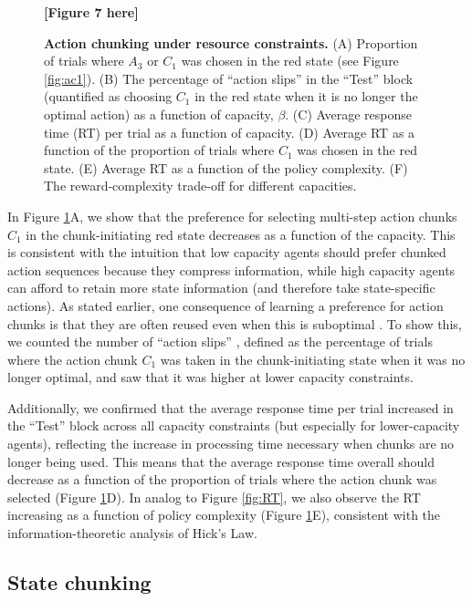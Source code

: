 \documentclass[11pt]{article}
\begin{document}
\begin{figure}
    \centering
    \textbf{[Figure 7 here]}
    \caption{\textbf{Action chunking under resource constraints.} (A) Proportion of trials where $A_3$ or $C_1$ was chosen in the red state (see Figure \ref{fig:ac1}). (B) The percentage of ``action slips'' in the ``Test'' block (quantified as choosing $C_1$ in the red state when it is no longer the optimal action) as a function of capacity, $\beta$. (C) Average response time (RT) per trial as a function of capacity. (D) Average RT as a function of the proportion of trials where $C_1$ was chosen in the red state. (E) Average RT as a function of the policy complexity. (F) The reward-complexity trade-off for different capacities.}
    \label{fig:ac2}
\end{figure}

In Figure \ref{fig:ac2}A, we show that the preference for selecting multi-step action chunks $C_1$ in the chunk-initiating red state decreases as a function of the capacity. This is consistent with the intuition that low capacity agents should prefer chunked action sequences because they compress information, while high capacity agents can afford to retain more state information (and therefore take state-specific actions). As stated earlier, one consequence of learning a preference for action chunks is that they are often reused even when this is suboptimal \citep{Huys2015-cq}. To show this, we counted the number of  ``action slips'' \citep[cf.][]{norman81}, defined as the percentage of trials where the action chunk $C_1$ was taken in the chunk-initiating state when it was no longer optimal, and saw that it was higher at lower capacity constraints. 

Additionally, we confirmed that the average response time per trial increased in the ``Test'' block across all capacity constraints (but especially for lower-capacity agents), reflecting the increase in processing time necessary when chunks are no longer being used. This means that the average response time overall should decrease as a function of the proportion of trials where the action chunk was selected (Figure \ref{fig:ac2}D). In analog to Figure \ref{fig:RT}, we also observe the RT increasing as a function of policy complexity (Figure \ref{fig:ac2}E), consistent with the information-theoretic analysis of Hick's Law.


\subsection{State chunking}
\end{document}
